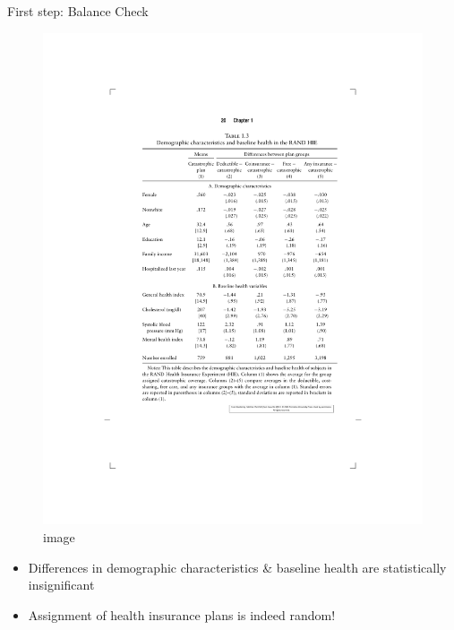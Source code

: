 \documentclass[
  ignorenonframetext,
]{beamer}
\begin{document}
\begin{frame}{First step: Balance Check}
\protect\hypertarget{first-step-balance-check}{}
\begin{figure}
\centering
\includegraphics{figure_table/MMtbl13.pdf}
\caption{image}
\end{figure}

\begin{itemize}
\item
  Differences in demographic characteristics \& baseline health are
  statistically insignificant
\item
  Assignment of health insurance plans is indeed random!
\end{itemize}
\end{frame}
\end{document}
